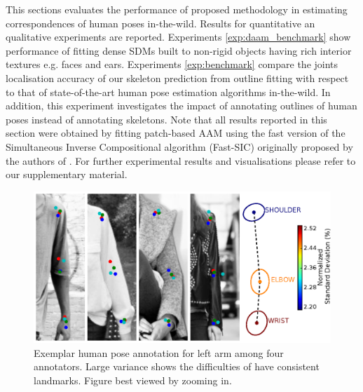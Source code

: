 This sections evaluates the performance of proposed methodology in estimating correspondences of human poses in-the-wild. Results for quantitative an qualitative experiments are reported. Experiments \ref{exp:daam_benchmark} show performance of fitting dense SDMs built to non-rigid objects having rich interior textures e.g. faces and ears. Experiments \ref{exp:benchmark} compare the joints localisation accuracy of our skeleton prediction from outline fitting with respect to that of state-of-the-art human pose estimation algorithms in-the-wild. In addition, this experiment investigates the impact of annotating outlines of human poses instead of annotating skeletons. Note that all results reported in this section were obtained by fitting patch-based AAM using the fast version of the Simultaneous Inverse Compositional algorithm (Fast-SIC) originally proposed by the authors of \cite{Papandreou2008}. For further experimental results and visualisations please refer to our supplementary material.

\begin{figure}[t!]
    \centering
    \includegraphics[width=\columnwidth]{resources/Fig_Variance/final}
    \caption{Exemplar human pose annotation for left arm among four annotators. Large variance shows the difficulties of have consistent landmarks. Figure best viewed by zooming in.}
    \label{fig:variance}
\end{figure}









